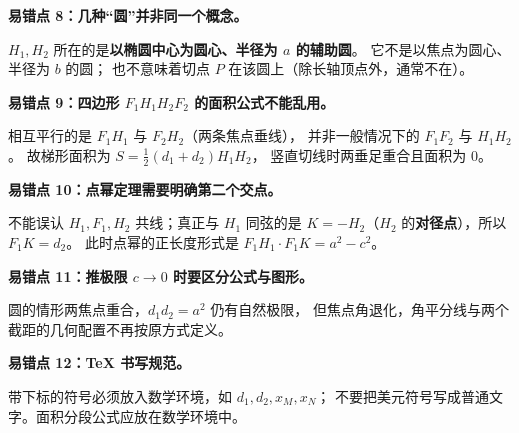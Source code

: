 \begin{trapbox}
\textbf{易错点 8：几种“圆”并非同一个概念。}

$H_1,H_2$ 所在的是\textbf{以椭圆中心为圆心、半径为 $a$ 的辅助圆}。
它不是以焦点为圆心、半径为 $b$ 的圆；
也不意味着切点 $P$ 在该圆上（除长轴顶点外，通常不在）。

\textbf{易错点 9：四边形 $F_1H_1H_2F_2$ 的面积公式不能乱用。}

相互平行的是 $F_1H_1$ 与 $F_2H_2$（两条焦点垂线），
并非一般情况下的 $F_1F_2$ 与 $H_1H_2$。
故梯形面积为 $S=\frac12(d_1+d_2)H_1H_2$，
竖直切线时两垂足重合且面积为 $0$。

\textbf{易错点 10：点幂定理需要明确第二个交点。}

不能误认 $H_1,F_1,H_2$ 共线；真正与 $H_1$ 同弦的是
$K=-H_2$（$H_2$ 的\textbf{对径点}），所以 $F_1K=d_2$。
此时点幂的正长度形式是 $F_1H_1\cdot F_1K=a^2-c^2$。

\textbf{易错点 11：推极限 $c\to0$ 时要区分公式与图形。}

圆的情形两焦点重合，$d_1d_2=a^2$ 仍有自然极限，
但焦点角退化，角平分线与两个截距的几何配置不再按原方式定义。

\textbf{易错点 12：TeX 书写规范。}

带下标的符号必须放入数学环境，如 $d_1,d_2,x_M,x_N$；
不要把美元符号写成普通文字。面积分段公式应放在数学环境中。
\end{trapbox}

